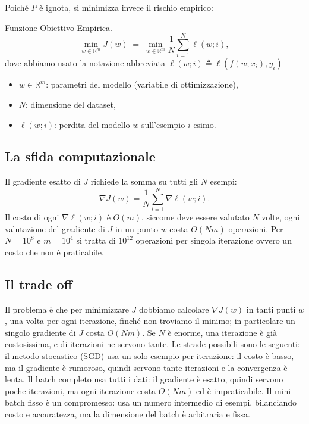 \documentclass[a4paper,12pt]{article}
\numberwithin{equation}{section}
\numberwithin{figure}{section}
\numberwithin{table}{section}
\newcommand{\R}{\mathbb{R}}
\begin{document}
Poich\'e $P$ \`e ignota, si minimizza invece il rischio empirico:

\begin{definitionbox}
  Funzione Obiettivo Empirica.
  \begin{equation}\label{eq:empirical_risk}
    \min_{w \in \R^m} J(w) \;=\; \min_{w \in \R^m}\frac{1}{N} \sum_{i=1}^{N} \ell(w; i),
  \end{equation}
  dove abbiamo usato la notazione abbreviata $\ell(w;i) \triangleq \ell(f(w;x_i), y_i)$
  \begin{itemize}
    \item $w \in \R^m$: parametri del modello (variabile di ottimizzazione),
    \item $N$: dimensione del dataset,
    \item $\ell(w;i)$: perdita del modello $w$ sull'esempio $i$-esimo.
  \end{itemize}
\end{definitionbox}

\subsection{La sfida computazionale}

Il gradiente esatto di $J$ richiede la somma su tutti gli $N$ esempi:
\[
  \nabla J(w) = \frac{1}{N}\sum_{i=1}^N \nabla \ell(w;i).
\]
Il costo di ogni $\nabla \ell(w;i)$ \`e $O(m)$, siccome deve essere valutato $N$ volte, ogni valutazione del gradiente di $J $ in un punto $ w $ costa $O(Nm)$ operazioni. Per $N=10^8$ e $m=10^4$ si tratta di $10^{12}$ operazioni per singola iterazione ovvero un costo che non è praticabile.

\subsection{Il trade off}

Il problema è che per minimizzare \(J\) dobbiamo calcolare \(\nabla J(w)\) in tanti punti \(w\), una volta per ogni iterazione, finché non troviamo il minimo; in particolare un singolo gradiente di \(J\) costa \(O(Nm)\). Se \(N\) è enorme, una iterazione è già costosissima, e di iterazioni ne servono tante. Le strade possibili sono le seguenti: il metodo stocastico (SGD) usa un solo esempio per iterazione: il costo è basso, ma il gradiente è rumoroso, quindi servono tante iterazioni e la convergenza è lenta.
Il batch completo usa tutti i dati: il gradiente è esatto, quindi servono poche iterazioni, ma ogni iterazione costa \(O(Nm)\) ed è impraticabile.
Il mini batch fisso è un compromesso: usa un numero intermedio di esempi, bilanciando costo e accuratezza, ma la dimensione del batch è arbitraria e fissa.
\end{document}
